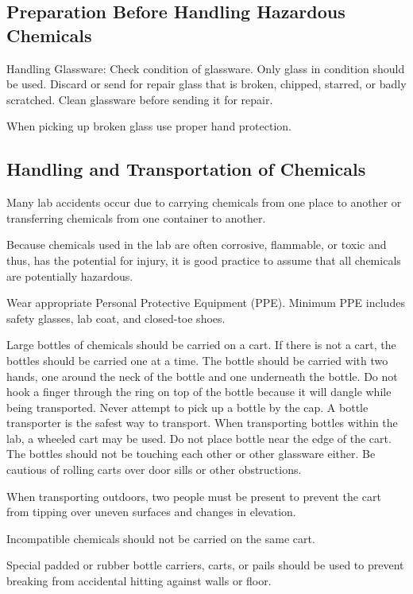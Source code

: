 \documentclass[12pt]{../SOP2}
\begin{document}
\subsection{Preparation Before Handling Hazardous Chemicals}


\NP Handling Glassware: Check condition of glassware. Only glass in condition should be used. Discard or send for repair glass that is broken, chipped, starred, or badly scratched. Clean glassware before sending it for repair. 

\NP When picking up broken glass use proper hand protection.

\subsection{Handling and Transportation of Chemicals}

\NP Many lab accidents occur due to carrying chemicals from one place to another or transferring chemicals from one container to another. 

\NP Because chemicals used in the lab are often corrosive, flammable, or toxic and thus, has the potential for injury, it is good practice to assume that all chemicals are potentially hazardous. 

\NP Wear appropriate Personal Protective Equipment (PPE). Minimum PPE includes safety glasses, lab coat, and closed-toe shoes.

\NP Large bottles of chemicals should be carried on a cart. If there is not a cart, the bottles should be carried one at a time. The bottle should be carried with two hands, one around the neck of the bottle and one underneath the bottle. Do not hook a finger through the ring on top of the bottle because it will dangle while being transported. Never attempt to pick up a bottle by the cap. A bottle transporter is the safest way to transport. 
When transporting bottles within the lab, a wheeled cart may be used. Do not place bottle near the edge of the cart. The bottles should not be touching each other or other glassware either. Be cautious of rolling carts over door sills or other obstructions.

\NP When transporting outdoors, two people must be present to prevent the cart from tipping over uneven surfaces and changes in elevation.

\NP Incompatible chemicals should not be carried on the same cart. 

\NP Special padded or rubber bottle carriers, carts, or pails should be used to prevent breaking from accidental hitting against walls or floor. 
\end{document}
